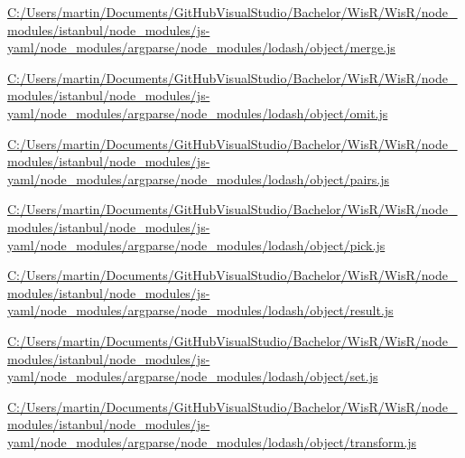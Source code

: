 \begin{DoxyCompactItemize}
\item 
\hyperlink{_c_1_2_users_2martin_2_documents_2_git_hub_visual_studio_2_bachelor_2_wis_r_2_wis_r_2node_modulebf1160bae7eb22fdbb16d729d621cb47}{C\+:/\+Users/martin/\+Documents/\+Git\+Hub\+Visual\+Studio/\+Bachelor/\+Wis\+R/\+Wis\+R/node\+\_\+modules/istanbul/node\+\_\+modules/js-\/yaml/node\+\_\+modules/argparse/node\+\_\+modules/lodash/object/merge.\+js}
\item 
\hyperlink{_c_1_2_users_2martin_2_documents_2_git_hub_visual_studio_2_bachelor_2_wis_r_2_wis_r_2node_module09dbedaf10fc72ef0c90db9fb033e421}{C\+:/\+Users/martin/\+Documents/\+Git\+Hub\+Visual\+Studio/\+Bachelor/\+Wis\+R/\+Wis\+R/node\+\_\+modules/istanbul/node\+\_\+modules/js-\/yaml/node\+\_\+modules/argparse/node\+\_\+modules/lodash/object/omit.\+js}
\item 
\hyperlink{_c_1_2_users_2martin_2_documents_2_git_hub_visual_studio_2_bachelor_2_wis_r_2_wis_r_2node_modulecdf17760245cbc19d42eb774e42ecedc}{C\+:/\+Users/martin/\+Documents/\+Git\+Hub\+Visual\+Studio/\+Bachelor/\+Wis\+R/\+Wis\+R/node\+\_\+modules/istanbul/node\+\_\+modules/js-\/yaml/node\+\_\+modules/argparse/node\+\_\+modules/lodash/object/pairs.\+js}
\item 
\hyperlink{_c_1_2_users_2martin_2_documents_2_git_hub_visual_studio_2_bachelor_2_wis_r_2_wis_r_2node_module8e8ca8a6e60246b7adc5a3c280b6a21b}{C\+:/\+Users/martin/\+Documents/\+Git\+Hub\+Visual\+Studio/\+Bachelor/\+Wis\+R/\+Wis\+R/node\+\_\+modules/istanbul/node\+\_\+modules/js-\/yaml/node\+\_\+modules/argparse/node\+\_\+modules/lodash/object/pick.\+js}
\item 
\hyperlink{_c_1_2_users_2martin_2_documents_2_git_hub_visual_studio_2_bachelor_2_wis_r_2_wis_r_2node_modulea6f0ac3c6e21bbcd1a4cde4fc1611792}{C\+:/\+Users/martin/\+Documents/\+Git\+Hub\+Visual\+Studio/\+Bachelor/\+Wis\+R/\+Wis\+R/node\+\_\+modules/istanbul/node\+\_\+modules/js-\/yaml/node\+\_\+modules/argparse/node\+\_\+modules/lodash/object/result.\+js}
\item 
\hyperlink{_c_1_2_users_2martin_2_documents_2_git_hub_visual_studio_2_bachelor_2_wis_r_2_wis_r_2node_module0bba656593aa25ce2588fe28a1129b69}{C\+:/\+Users/martin/\+Documents/\+Git\+Hub\+Visual\+Studio/\+Bachelor/\+Wis\+R/\+Wis\+R/node\+\_\+modules/istanbul/node\+\_\+modules/js-\/yaml/node\+\_\+modules/argparse/node\+\_\+modules/lodash/object/set.\+js}
\item 
\hyperlink{_c_1_2_users_2martin_2_documents_2_git_hub_visual_studio_2_bachelor_2_wis_r_2_wis_r_2node_moduleb821af34deb9efd729639cdaa46510d2}{C\+:/\+Users/martin/\+Documents/\+Git\+Hub\+Visual\+Studio/\+Bachelor/\+Wis\+R/\+Wis\+R/node\+\_\+modules/istanbul/node\+\_\+modules/js-\/yaml/node\+\_\+modules/argparse/node\+\_\+modules/lodash/object/transform.\+js}

\end{DoxyCompactItemize}
